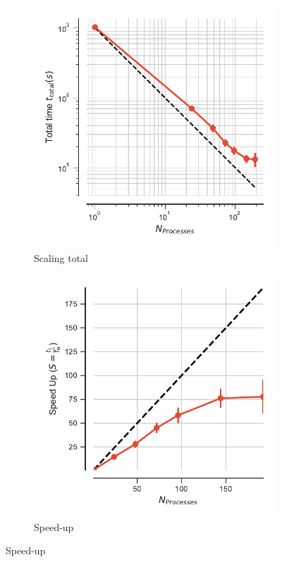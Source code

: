 \begin{figure}
\centering
\begin{subfigure}{.4\textwidth}
  \includegraphics[width=\linewidth]{figures/split-t_total.pdf}
  \caption{Scaling total}
  \label{fig:MPIscaling-split}
\end{subfigure}
\hfill
\begin{subfigure}{.4\textwidth}
  \includegraphics[width=\linewidth]{figures/split-speed_up.pdf}
  \caption{Speed-up}
  \label{fig:MPIspeedup-split}
\end{subfigure}
\bigskip


\end{figure}
